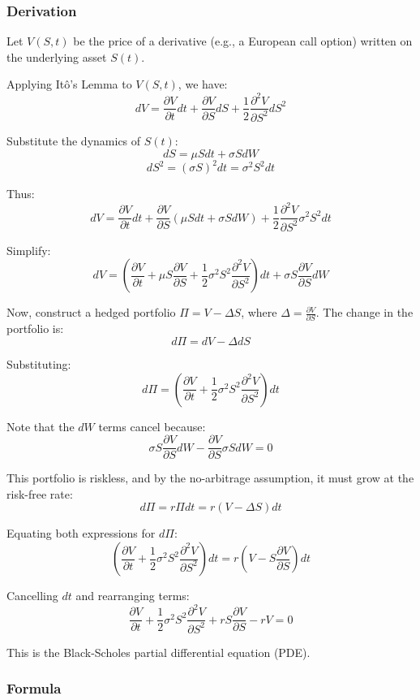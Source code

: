 \subsubsection{Derivation}
Let \( V(S,t) \) be the price of a derivative (e.g., a European call option) written on the underlying asset \( S(t) \).

Applying Itô's Lemma to \( V(S,t) \), we have:
\[
dV = \frac{\partial V}{\partial t} dt + \frac{\partial V}{\partial S} dS + \frac{1}{2} \frac{\partial^2 V}{\partial S^2} dS^2
\]

Substitute the dynamics of \( S(t) \):
\[
dS = \mu S dt + \sigma S dW
\]
\[
dS^2 = (\sigma S)^2 dt = \sigma^2 S^2 dt
\]

Thus:
\[
dV = \frac{\partial V}{\partial t} dt + \frac{\partial V}{\partial S} (\mu S dt + \sigma S dW) + \frac{1}{2} \frac{\partial^2 V}{\partial S^2} \sigma^2 S^2 dt
\]

Simplify:
\[
dV = \left( \frac{\partial V}{\partial t} + \mu S \frac{\partial V}{\partial S} + \frac{1}{2} \sigma^2 S^2 \frac{\partial^2 V}{\partial S^2} \right) dt + \sigma S \frac{\partial V}{\partial S} dW
\]

Now, construct a hedged portfolio \( \Pi = V - \Delta S \), where \( \Delta = \frac{\partial V}{\partial S} \). The change in the portfolio is:
\[
d\Pi = dV - \Delta dS
\]

Substituting:
\[
d\Pi = \left( \frac{\partial V}{\partial t} + \frac{1}{2} \sigma^2 S^2 \frac{\partial^2 V}{\partial S^2} \right) dt
\]

Note that the \( dW \) terms cancel because:
\[
\sigma S \frac{\partial V}{\partial S} dW - \frac{\partial V}{\partial S} \sigma S dW = 0
\]

This portfolio is riskless, and by the no-arbitrage assumption, it must grow at the risk-free rate:
\[
d\Pi = r \Pi dt = r(V - \Delta S) dt
\]

Equating both expressions for \( d\Pi \):
\[
\left( \frac{\partial V}{\partial t} + \frac{1}{2} \sigma^2 S^2 \frac{\partial^2 V}{\partial S^2} \right) dt = r \left( V - S \frac{\partial V}{\partial S} \right) dt
\]

Cancelling \( dt \) and rearranging terms:
\[
\frac{\partial V}{\partial t} + \frac{1}{2} \sigma^2 S^2 \frac{\partial^2 V}{\partial S^2} + r S \frac{\partial V}{\partial S} - rV = 0
\]

This is the Black-Scholes partial differential equation (PDE).

\subsubsection{Formula}

